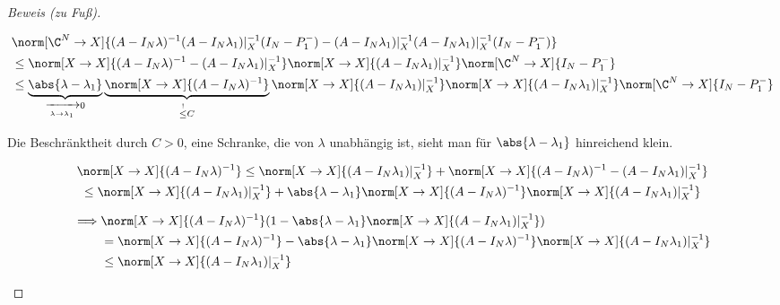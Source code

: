 \begin{proof}[Beweis (zu Fuß)]
\begin{enumerate}[label = (\roman*)]
        \begin{align*}
            &
            \norm[\C^N \to X]
            {
                (A - I_N \lambda)^{-1}
                (A - I_N \lambda_1) |_X^{-1}
                (I_N - P_1^-)
                -
                (A - I_N \lambda_1) |_X^{-1}
                (A - I_N \lambda_1) |_X^{-1}
                (I_N - P_1^-)
            } \\
            & \leq
            \norm[X \to X]
            {
                (A - I_N \lambda)^{-1}
                -
                (A - I_N \lambda_1) |_X^{-1}
            }
            \norm[X \to X]{(A - I_N \lambda_1) |_X^{-1}}
            \norm[\C^N \to X]{I_N - P_1^-} \\
            & \leq
            \underbrace
            {
                \abs{\lambda - \lambda_1}
            }_{
                \xrightarrow[\lambda \to \lambda_1]{} 0
            }
            \underbrace
            {
                \norm[X \to X]{(A - I_N \lambda)^{-1}}
            }_{
                \stackrel{!}{\leq} C
            }
            \norm[X \to X]{(A - I_N \lambda_1) |_X^{-1}}
            \norm[X \to X]{(A - I_N \lambda_1) |_X^{-1}}
            \norm[\C^N \to X]{I_N - P_1^-}
        \end{align*}

        Die Beschränktheit durch $C > 0$, eine Schranke, die von $\lambda$ unabhängig ist, sieht man für $\abs{\lambda - \lambda_1}$ hinreichend klein.

        \begin{multline*}
            \norm[X \to X]{(A - I_N \lambda)^{-1}}
            \leq
            \norm[X \to X]{(A - I_N \lambda_1) |_X^{-1}}
            +
            \norm[X \to X]
            {
                (A - I_N \lambda)^{-1}
                -
                (A - I_N \lambda_1) |_X^{-1}
            } \\
            \leq
            \norm[X \to X]{(A - I_N \lambda_1) |_X^{-1}}
            +
            \abs{\lambda - \lambda_1}
            \norm[X \to X]{(A - I_N \lambda)^{-1}}
            \norm[X \to X]{(A - I_N \lambda_1) |_X^{-1}}           
        \end{multline*}

        \begin{align*}
            \implies
            &
            \norm[X \to X]{(A - I_N \lambda)^{-1}}
            (
                1
                -
                \abs{\lambda - \lambda_1}
                \norm[X \to X]{(A - I_N \lambda_1) |_X^{-1}}
            ) \\
            & =
            \norm[X \to X]{(A - I_N \lambda)^{-1}}
            -
            \abs{\lambda - \lambda_1}
            \norm[X \to X]{(A - I_N \lambda)^{-1}}
            \norm[X \to X]{(A - I_N \lambda_1) |_X^{-1}} \\
            & \leq
            \norm[X \to X]{(A - I_N \lambda_1) |_X^{-1}}
        \end{align*}


\end{enumerate}
\end{proof}
